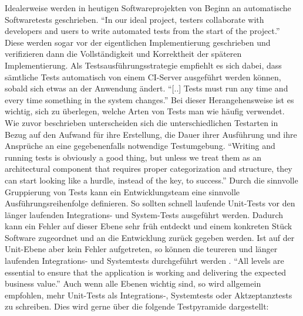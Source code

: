 Idealerweise werden in heutigen Softwareprojekten von Beginn an automatische Softwaretests geschrieben. "`In our ideal project, testers collaborate with developers and users to write automated tests from the start of the project."' \citep[S.][S. 83]{HumFar10} Diese werden sogar vor der eigentlichen Implementierung geschrieben und verifizieren dann die Vollständigkeit und Korrektheit der späteren Implementierung. Als Testsausführungsstrategie empfiehlt es sich dabei, dass sämtliche Tests automatisch von einem CI-Server ausgeführt werden können, sobald sich etwas an der Anwendung ändert. \citep[Vgl.][S. 83]{HumFar10} "`[..] Tests must run any time and every time something in the system changes."' \citep[S.][S. 131]{DuvMatAnd07} Bei dieser Herangehensweise ist es wichtig, sich zu überlegen, welche Arten von Tests man wie häufig verwendet. Wie zuvor beschrieben unterscheiden sich die unterschiedlichen Testarten in Bezug auf den Aufwand für ihre Erstellung, die Dauer ihrer Ausführung und ihre Ansprüche an eine gegebenenfalls notwendige Testumgebung. "`Writing and running tests is obviously a good thing, but unless we treat them as an architectural component that requires proper categorization and structure, they can start looking like a hurdle, instead of the key, to success."' \citep[S.][S. 138]{DuvMatAnd07} Durch die sinnvolle Gruppierung von Tests kann ein Entwicklungsteam eine sinnvolle Ausführungsreihenfolge definieren. So sollten schnell laufende Unit-Tests vor den länger laufenden Integrations- und System-Tests ausgeführt werden. Dadurch kann ein Fehler auf dieser Ebene sehr früh entdeckt und einem konkreten Stück Software zugeordnet und an die Entwicklung zurück gegeben werden. Ist auf der Unit-Ebene aber kein Fehler aufgetreten, so können die teureren und länger laufenden Integrations- und Systemtests durchgeführt werden \citep[Vgl.][S. 138]{DuvMatAnd07}. "`All levels are essential to ensure that the application is working and delivering the expected business value."' \citep[S.][S. 178]{HumFar10} Auch wenn alle Ebenen wichtig sind, so wird allgemein empfohlen, mehr Unit-Tests als Integrations-, Systemtests oder Aktzeptanztests zu schreiben. Dies wird gerne über die folgende Testpyramide dargestellt:

